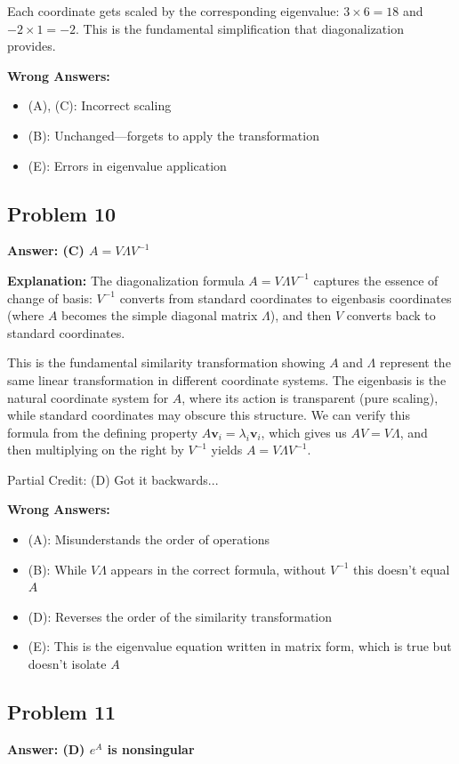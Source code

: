 \documentclass[12pt]{amsart}
\newcommand{\correct}[1]{{\color{correctgreen}\textbf{#1}}}
\newcommand{\partcred}[1]{{\color{partialblue}#1}}
\begin{document}
{Each coordinate gets scaled by the corresponding eigenvalue: $3 \times 6 = 18$ and $-2 \times 1 = -2$. This is the fundamental simplification that diagonalization provides.

\textbf{Wrong Answers:}
\begin{itemize}
\item (A), (C): Incorrect scaling
\item (B): Unchanged—forgets to apply the transformation
\item (E): Errors in eigenvalue application
\end{itemize}

\subsection*{Problem 10}
\correct{Answer: (C) $A = V\Lambda V^{-1}$}

\textbf{Explanation:} The diagonalization formula $A = V\Lambda V^{-1}$ captures the essence of change of basis: $V^{-1}$ converts from standard coordinates to eigenbasis coordinates (where $A$ becomes the simple diagonal matrix $\Lambda$), and then $V$ converts back to standard coordinates.

This is the fundamental similarity transformation showing $A$ and $\Lambda$ represent the same linear transformation in different coordinate systems. The eigenbasis is the natural coordinate system for $A$, where its action is transparent (pure scaling), while standard coordinates may obscure this structure. We can verify this formula from the defining property $A\mathbf{v}_i = \lambda_i\mathbf{v}_i$, which gives us $AV = V\Lambda$, and then multiplying on the right by $V^{-1}$ yields $A = V\Lambda V^{-1}$.

\partcred{Partial Credit: (D) Got it backwards...}

\textbf{Wrong Answers:}
\begin{itemize}
\item (A): Misunderstands the order of operations
\item (B): While $V\Lambda$ appears in the correct formula, without $V^{-1}$ this doesn't equal $A$
\item (D): Reverses the order of the similarity transformation
\item (E): This is the eigenvalue equation written in matrix form, which is true but doesn't isolate $A$
\end{itemize}

\subsection*{Problem 11}
\correct{Answer: (D) $e^A$ is nonsingular}

}
\end{document}
